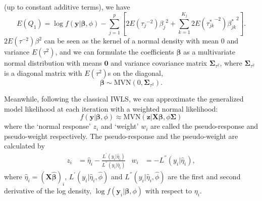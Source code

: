 \documentclass[AMA,STIX1COL,]{WileyNJD-v2}
\begin{document}
(up to constant additive terms), we have
\begin{equation}\label{eq:EQ1_IWLS}
E(Q_1) = \log f(\textbf{y}|\boldsymbol{\beta}, \phi) - \sum\limits_{j=1}^p\left[ {2E({\tau_j}^{-2})}{\beta_j}^2 +\sum\limits_{k=1}^{K_j} {2E({\tau_{jk}^*}^{-2})}{\beta_{jk}^*}^2\right].
\end{equation} \(2E({\tau}^{-2})\beta^2\) can be seen as the kernel of a
normal density with mean 0 and variance \(E(\tau^{2})\), and we can
formulate the coefficients \(\boldsymbol{\beta}\) as a multivariate
normal distribution with means \(\boldsymbol{0}\) and variance
covariance matrix \(\boldsymbol{\Sigma}_{\tau^2}\), where
\(\boldsymbol{\Sigma}_{\tau^2}\) is a diagonal matrix with
\(E(\tau^2)\)s on the diagonal, \[
\boldsymbol{\beta }\sim \text{MVN}(0, \boldsymbol{\Sigma}_{\tau^2}).
\]

Meanwhile, following the classical IWLS, we can approximate the
generalized model likelihood at each iteration with a weighted normal
likelihood: \[
f(\textbf{y}|\boldsymbol{\beta}, \phi) \approx \text{MVN}(\textbf{z}|\boldsymbol{X} \boldsymbol{\beta}, \phi\boldsymbol{\Sigma })
\] where the `normal response' \(z_i\) and `weight' \(w_i\) are called
the pseudo-response and pseudo-weight respectively. The pseudo-response
and the pseudo-weight are calculated by \[
\begin{aligned}
z_i &= \hat\eta_i - \frac{L^{'}(y_i|\hat\eta_i)}{L^{''}(y_i|\hat\eta_i)}& w_i &= - L^{''}(y_i|\hat\eta_i),
\end{aligned}
\] where \(\hat\eta_i = (\boldsymbol{X} {\hat{\boldsymbol{\beta}}})_i\),
\(L^{'}(y_i|\hat\eta_i, \hat \phi)\) and
\(L^{''}(y_i|\hat\eta_i, \hat \phi)\) are the first and second
derivative of the log density,
\(\log f(\textbf{y}_i|\boldsymbol{\beta}, \phi)\) with respect to
\(\eta_i\).
\end{document}
